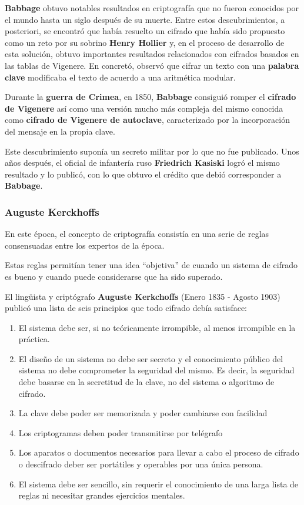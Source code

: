 \documentclass[nochap]{apuntesURJC}
\begin{document}
\textbf{Babbage} obtuvo notables resultados en criptografía que no fueron conocidos por el mundo hasta un siglo después de su muerte. Entre estos descubrimientos, a posteriori, se encontró que había resuelto un cifrado que había sido propuesto como un reto por su sobrino \textbf{Henry Hollier} y, en el proceso de desarrollo de esta solución, obtuvo importantes resultados relacionados con cifrados basados en las tablas de Vigenere. En concretó, observó que cifrar un texto con una \textbf{palabra clave} modificaba el texto de acuerdo a una aritmética modular.

Durante la \textbf{guerra de Crimea}, en 1850, \textbf{Babbage} consiguió romper el \textbf{cifrado de Vigenere} así como una versión mucho más compleja del mismo conocida como \textbf{cifrado de Vigenere de autoclave}, caracterizado por la incorporación del mensaje en la propia clave.

Este descubrimiento suponía un secreto militar por lo que no fue publicado. Unos años después, el oficial de infantería ruso \textbf{Friedrich Kasiski} logró el mismo resultado y lo publicó, con lo que obtuvo el crédito que debió corresponder a \textbf{Babbage}.

\subsubsection{Auguste Kerckhoffs}
En este época, el concepto de criptografía consistía en una serie de reglas consensuadas entre los expertos de la época.

Estas reglas permitían tener una idea ``objetiva'' de cuando un sistema de cifrado es bueno y cuando puede considerarse que ha sido superado.

El lingüista y criptógrafo \textbf{Auguste Kerkchoffs} (Enero 1835 - Agosto 1903) publicó una lista de seis principios que todo cifrado debía satisface:
\begin{enumerate}
\item El sistema debe ser, si no teóricamente irrompible, al menos irrompible en la práctica.
\item El diseño de un sistema no debe ser secreto y el conocimiento público del sistema no debe comprometer la seguridad del mismo. Es decir, la seguridad debe basarse en la secretitud de la clave, no del sistema o algoritmo de cifrado.
\item La clave debe poder ser memorizada y poder cambiarse con facilidad
\item Los criptogramas deben poder transmitirse por telégrafo
\item Los aparatos o documentos necesarios para llevar a cabo el proceso de cifrado o descifrado deber ser portátiles y operables por una única persona.
\item El sistema debe ser sencillo, sin requerir el conocimiento de una larga lista de reglas ni necesitar grandes ejercicios mentales.
\end{enumerate}
\end{document}
